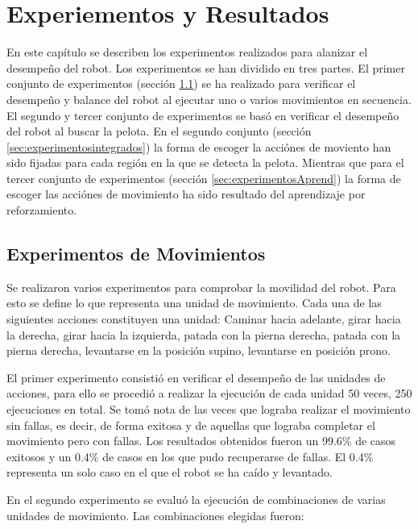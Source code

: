 \chapter{Experiementos y Resultados}\label{chapter:resultados}
En este capítulo se describen los experimentos realizados para alanizar el desempeño del robot. Los experimentos se han dividido en tres partes. El primer conjunto de experimentos (sección \ref{sec:experimentosMov}) se ha realizado para verificar el desempeño y balance del robot al ejecutar uno o varios movimientos en secuencia. El segundo y tercer conjunto de experimentos se bas\'o en verificar el desempeño del robot al buscar la pelota. En el segundo conjunto (sección \ref{sec:experimentosintegrados}) la forma de escoger la acciónes de moviento han sido fijadas para cada región en la que se detecta la pelota. Mientras que para el tercer conjunto de experimentos (secci\'on \ref{sec:experimentosAprend}) la forma de escoger las acci\'ones de movimiento ha sido resultado del aprendizaje por reforzamiento. 
 
\section{Experimentos de Movimientos}\label{sec:experimentosMov}

Se realizaron varios experimentos para comprobar la movilidad del robot. Para esto se define lo que representa una unidad de movimiento. Cada una de las siguientes acciones constituyen una unidad: Caminar hacia adelante, girar hacia la derecha, girar hacia la izquierda, patada con la pierna derecha, patada con la pierna derecha, levantarse en la posición supino, levantarse en posición prono.

El primer experimento consistió en verificar el desempeño de las unidades de acciones, para ello se procedió a realizar la ejecución de cada unidad 50 veces, 250 ejecuciones en total. Se tomó nota de las veces que lograba realizar el movimiento sin fallas, es decir, de forma exitosa y de aquellas que lograba completar el movimiento pero con fallas. Los resultados obtenidos fueron un 99.6\% de casos exitosos y un 0.4\% de casos en los que pudo recuperarse de fallas. El 0.4\% representa un solo caso en el que el robot se ha caído y levantado.  

En el segundo experimento se evalu\'o la ejecuci\'on de  combinaciones de varias unidades de movimiento. Las combinaciones elegidas fueron: 

